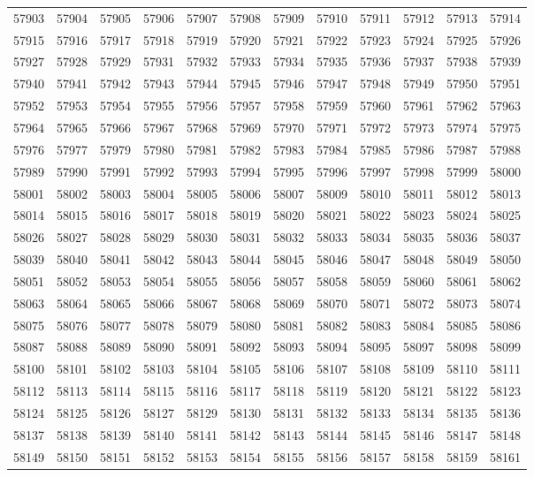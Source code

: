 \begin{center}
\begin{longtable}{llllllllllll}
57903 &57904 &57905 &57906 &57907 &57908 &57909 &57910 &57911 &57912 &57913 &57914 \\
57915 &57916 &57917 &57918 &57919 &57920 &57921 &57922 &57923 &57924 &57925 &57926 \\
57927 &57928 &57929 &57931 &57932 &57933 &57934 &57935 &57936 &57937 &57938 &57939 \\
57940 &57941 &57942 &57943 &57944 &57945 &57946 &57947 &57948 &57949 &57950 &57951 \\
57952 &57953 &57954 &57955 &57956 &57957 &57958 &57959 &57960 &57961 &57962 &57963 \\
57964 &57965 &57966 &57967 &57968 &57969 &57970 &57971 &57972 &57973 &57974 &57975 \\
57976 &57977 &57979 &57980 &57981 &57982 &57983 &57984 &57985 &57986 &57987 &57988 \\
57989 &57990 &57991 &57992 &57993 &57994 &57995 &57996 &57997 &57998 &57999 &58000 \\
58001 &58002 &58003 &58004 &58005 &58006 &58007 &58009 &58010 &58011 &58012 &58013 \\
58014 &58015 &58016 &58017 &58018 &58019 &58020 &58021 &58022 &58023 &58024 &58025 \\
58026 &58027 &58028 &58029 &58030 &58031 &58032 &58033 &58034 &58035 &58036 &58037 \\
58039 &58040 &58041 &58042 &58043 &58044 &58045 &58046 &58047 &58048 &58049 &58050 \\
58051 &58052 &58053 &58054 &58055 &58056 &58057 &58058 &58059 &58060 &58061 &58062 \\
58063 &58064 &58065 &58066 &58067 &58068 &58069 &58070 &58071 &58072 &58073 &58074 \\
58075 &58076 &58077 &58078 &58079 &58080 &58081 &58082 &58083 &58084 &58085 &58086 \\
58087 &58088 &58089 &58090 &58091 &58092 &58093 &58094 &58095 &58097 &58098 &58099 \\
58100 &58101 &58102 &58103 &58104 &58105 &58106 &58107 &58108 &58109 &58110 &58111 \\
58112 &58113 &58114 &58115 &58116 &58117 &58118 &58119 &58120 &58121 &58122 &58123 \\
58124 &58125 &58126 &58127 &58129 &58130 &58131 &58132 &58133 &58134 &58135 &58136 \\
58137 &58138 &58139 &58140 &58141 &58142 &58143 &58144 &58145 &58146 &58147 &58148 \\
58149 &58150 &58151 &58152 &58153 &58154 &58155 &58156 &58157 &58158 &58159 &58161 \\

\end{longtable}
\end{center}
